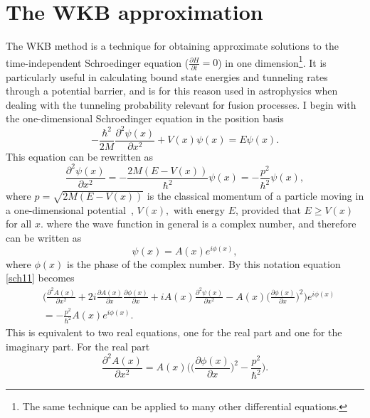\section{The WKB approximation}
The WKB method is a technique for obtaining approximate solutions to the time-independent Schroedinger equation ($\frac{\partial H}{\partial t}=0$) in one dimension\footnote{The same technique can be applied to many other differential equations.}. It is particularly useful in calculating bound state energies and tunneling rates through a potential barrier, and is for this reason used in astrophysics when dealing with the tunneling probability relevant for fusion processes. \newline
I begin with the one-dimensional Schroedinger equation in the position basis
\begin{equation}
	-\frac{\hbar^2}{2M}\frac{\partial^2\psi(x)}{\partial x^2}+V(x)\psi(x)=E\psi(x).
	\label{sch10}
\end{equation} 
This equation can be rewritten as
\begin{equation}
	\frac{\partial^2\psi(x)}{\partial x^2}=-\frac{2M(E-V(x))}{\hbar^2}\psi(x)=-\frac{p^2}{\hbar^2}\psi(x),
	\label{sch11}
\end{equation} 
where $p=\sqrt{2M(E-V(x))}$ is the classical momentum of a particle moving in a one-dimensional potential~\citep[p.346]{Griffiths}, $V(x),$ with energy $E$, provided that $E\geq V(x)$ for all $x$. where the wave function in general is a complex number, and therefore can be written as
\begin{equation}
	\psi(x)=A(x)e^{i\phi(x)},
\end{equation} 
where $\phi(x)$ is the phase of the complex number. By this notation equation \eqref{sch11} becomes
\begin{equation}
	\begin{split}
		&\bigg(\frac{\partial^2A(x)}{\partial x^2}+2i\frac{\partial A(x)}{\partial x}\frac{\partial \phi(x)}{\partial x}+iA(x)\frac{\partial^2\psi(x)}{\partial x^2}-A(x)\bigg(\frac{\partial \phi(x)}{\partial x}\bigg)^2\bigg)e^{i\phi(x)}\\
		&=-\frac{p^2}{\hbar^2}A(x)e^{i\phi(x)}.
	\end{split}
	\label{sch12}
\end{equation} 
This is equivalent to two real equations, one for the real part and one for the imaginary part. For the real part
\begin{equation}
	\frac{\partial^2A(x)}{\partial x^2}=A(x)\bigg(\bigg(\frac{\partial\phi(x)}{\partial x}\bigg)^2-\frac{p^2}{\hbar^2}\bigg).
	\label{sch13}
\end{equation} 
